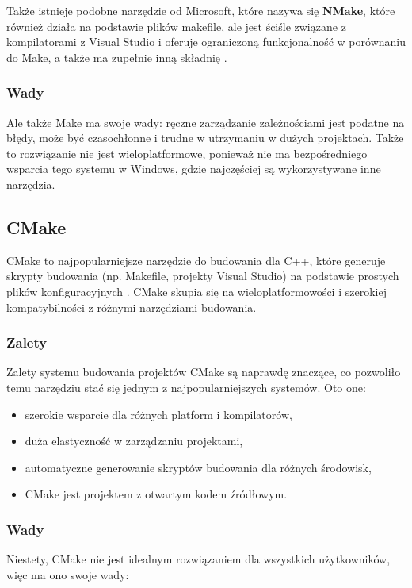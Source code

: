 Także istnieje podobne narzędzie od Microsoft, które nazywa się \textbf{NMake}, które również działa na podstawie plików makefile, ale jest ściśle związane z kompilatorami z Visual Studio i oferuje ograniczoną funkcjonalność w porównaniu do Make, a także ma zupełnie inną składnię \cite{nmake}.

\subsubsection{Wady}
Ale także Make ma swoje wady: ręczne zarządzanie zależnościami jest podatne na błędy, może być czasochłonne i trudne w utrzymaniu w dużych projektach. Także to rozwiązanie nie jest wieloplatformowe, ponieważ nie ma bezpośredniego wsparcia tego systemu w Windows, gdzie najczęściej są wykorzystywane inne narzędzia.

\subsection{CMake}
CMake to najpopularniejsze narzędzie do budowania dla C++, które generuje skrypty budowania (np. Makefile, projekty Visual Studio) na podstawie prostych plików konfiguracyjnych \cite{cmake}. CMake skupia się na wieloplatformowości i szerokiej kompatybilności z różnymi narzędziami budowania.

\subsubsection{Zalety}
Zalety systemu budowania projektów CMake są naprawdę znaczące, co pozwoliło temu narzędziu stać się jednym z najpopularniejszych systemów. Oto one:

\begin{itemize}
    \item szerokie wsparcie dla różnych platform i kompilatorów,
    \item duża elastyczność w zarządzaniu projektami,
    \item automatyczne generowanie skryptów budowania dla różnych środowisk,
    \item CMake jest projektem z otwartym kodem źródłowym.
\end{itemize}

\subsubsection{Wady}
Niestety, CMake nie jest idealnym rozwiązaniem dla wszystkich użytkowników, więc ma ono swoje wady:

